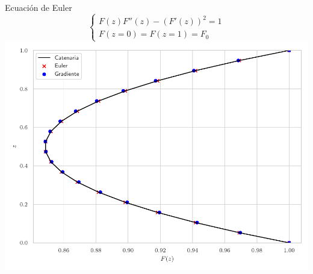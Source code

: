 \documentclass[11pt]{beamer}
\begin{document}
            \begin{frame}{Ecuación de Euler}
                \centering
                \begin{equation*}
                \begin{cases}
                    F(z) F''(z) - (F'(z))^2 = 1 \\
                    F(z = 0) = F(z = 1) = F_0
                \end{cases}
                \end{equation*}
                \includegraphics[width = 0.6 \linewidth]{Figuras/sol_euler.pdf}
            \end{frame}
	
\end{document}
